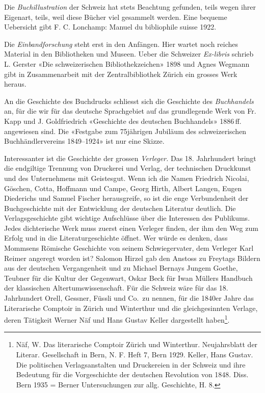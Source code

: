 \documentclass[a4paper,
fontsize=11pt,
oneside,
numbers=noperiodatend,
parskip=half-,
bibliography=totoc,
final
]{scrartcl}
\begin{document}
Die \emph{Buchillustration} der Schweiz hat stets Beachtung gefunden,
teils wegen ihrer Eigenart, teils, weil diese Bücher viel gesammelt
werden. Eine bequeme Uebersicht gibt F. C. Lonchamp: Manuel du
bibliophile suisse 1922.

Die \emph{Einbandforschung} steht erst in den Anfängen. Hier wartet noch
reiches Material in den Bibliotheken und Museen. Ueber die Schweizer
\emph{Ex-libris} schrieb L. Gerster «Die schweizerischen
Bibliothekzeichen» 1898 und Agnes Wegmann gibt in Zusammenarbeit mit der
Zentralbibliothek Zürich ein grosses Werk heraus.

An die Geschichte des Buchdrucks schliesst sich die Geschichte des
\emph{Buchhandels} an, für die wir für das deutsche Sprachgebiet auf das
grundlegende Werk von Fr. Kapp und J. Goldfriedrich «Geschichte des
deutschen Buchhandels» 1886\,ff. angewiesen sind. Die «Festgabe zum
75jährigen Jubiläum des schweizerischen Buchhändlervereins 1849--1924»
ist nur eine Skizze.

Interessanter ist die Geschichte der grossen \emph{Verleger.} Das 18.
Jahrhundert bringt die endgiltige Trennung von Druckerei und Verlag, der
technischen Druckkunst und des Unternehmens mit Geistesgut. Wenn ich die
Namen Friedrich Nicolai, Göschen, Cotta, Hoffmann und Campe, Georg
Hirth, Albert Langen, Eugen Diederichs und Samuel Fischer herausgreife,
so ist die enge Verbundenheit der Buchgeschichte mit der Entwicklung der
deutschen Literatur deutlich. Die Verlagsgeschichte gibt wichtige
Aufschlüsse über die Interessen des Publikums. Jedes dichterische Werk
muss zuerst einen Verleger finden, der ihm den Weg zum Erfolg und in die
Literaturgeschichte öffnet. Wer würde es denken, dass Mommsens Römische
Geschichte von seinem Schwiegervater, dem Verleger Karl Reimer angeregt
worden ist? Salomon Hirzel gab den Anstoss zu Freytags Bildern aus der
deutschen Vergangenheit und zu Michael Bernays Jungem Goethe, Teubner
für die Kultur der Gegenwart, Oskar Beck für Iwan Müllers Handbuch der
klassischen Altertumswissenschaft. Für die Schweiz wäre für das 18.
Jahrhundert Orell, Gessner, Füssli und Co.~zu nennen, für die 1840er
Jahre das Literarische Comptoir in Zürich und Winterthur und die
gleichgesinnten Verlage, deren Tätigkeit Werner Näf und Hans Gustav
Keller dargestellt haben\footnote{Näf, W. Das literarische Comptoir
  Zürich und Winterthur. Neujahrsblatt der Literar. Gesellschaft in
  Bern, N. F. Heft 7, Bern 1929. Keller, Hans Gustav. Die politischen
  Verlagsanstalten und Druckereien in der Schweiz und ihre Bedeutung für
  die Vorgeschichte der deutschen Revolution von 1848. Diss. Bern 1935 =
  Berner Untersuchungen zur allg. Geschichte, H. 8.}.
\end{document}

